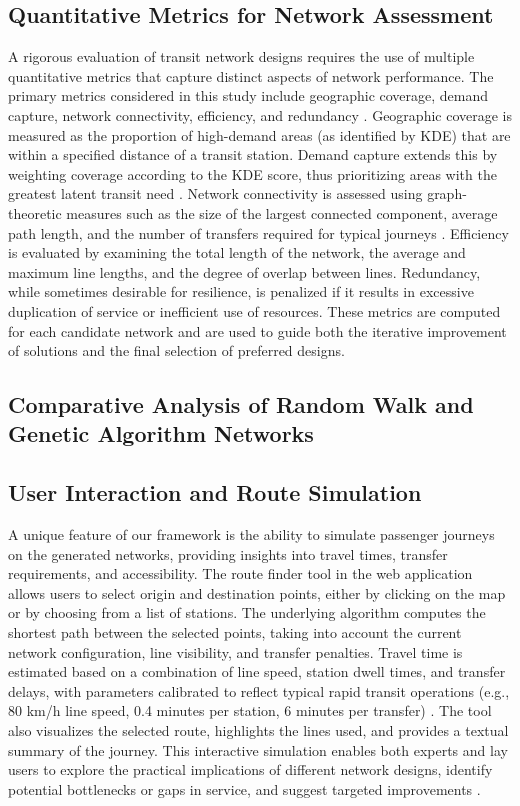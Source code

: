 \documentclass[manuscript]{acmart}
\begin{document}
\subsection{Quantitative Metrics for Network Assessment}
A rigorous evaluation of transit network designs requires the use of multiple quantitative metrics that capture distinct aspects of network performance. The primary metrics considered in this study include geographic coverage, demand capture, network connectivity, efficiency, and redundancy \cite{bib:bast2016route, bib:overview-field}. Geographic coverage is measured as the proportion of high-demand areas (as identified by KDE) that are within a specified distance of a transit station. Demand capture extends this by weighting coverage according to the KDE score, thus prioritizing areas with the greatest latent transit need \cite{bib:silverman1986density}. Network connectivity is assessed using graph-theoretic measures such as the size of the largest connected component, average path length, and the number of transfers required for typical journeys \cite{bib:bast2016route}. Efficiency is evaluated by examining the total length of the network, the average and maximum line lengths, and the degree of overlap between lines. Redundancy, while sometimes desirable for resilience, is penalized if it results in excessive duplication of service or inefficient use of resources. These metrics are computed for each candidate network and are used to guide both the iterative improvement of solutions and the final selection of preferred designs.

\subsection{Comparative Analysis of Random Walk and Genetic Algorithm Networks}

\subsection{User Interaction and Route Simulation}
A unique feature of our framework is the ability to simulate passenger journeys on the generated networks, providing insights into travel times, transfer requirements, and accessibility. The route finder tool in the web application allows users to select origin and destination points, either by clicking on the map or by choosing from a list of stations. The underlying algorithm computes the shortest path between the selected points, taking into account the current network configuration, line visibility, and transfer penalties. Travel time is estimated based on a combination of line speed, station dwell times, and transfer delays, with parameters calibrated to reflect typical rapid transit operations (e.g., 80 km/h line speed, 0.4 minutes per station, 6 minutes per transfer) \cite{bib:wmata-vmt}. The tool also visualizes the selected route, highlights the lines used, and provides a textual summary of the journey. This interactive simulation enables both experts and lay users to explore the practical implications of different network designs, identify potential bottlenecks or gaps in service, and suggest targeted improvements \cite{bib:bast2016route}.
\end{document}

